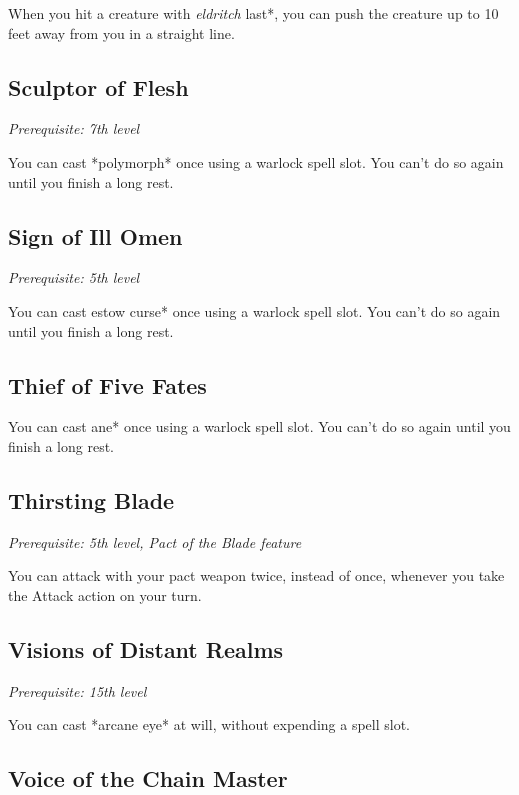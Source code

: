 When you hit a creature with \textit{eldritch }last*, you can push the creature up to 10 feet away from you in a straight line.

\subsection{Sculptor of Flesh}

\textit{Prerequisite: 7th level}

You can cast *polymorph* once using a warlock spell slot. You can’t do so again until you finish a long rest.

\subsection{Sign of Ill Omen}

\textit{Prerequisite: 5th level}

You can cast \textit{}estow curse* once using a warlock spell slot. You can’t do so again until you finish a long rest.

\subsection{Thief of Five Fates}

You can cast \textit{}ane* once using a warlock spell slot. You can’t do so again until you finish a long rest.

\subsection{Thirsting Blade}

\textit{Prerequisite: 5th level, Pact of the Blade feature}

You can attack with your pact weapon twice, instead of once, whenever you take the Attack action on your turn.

\subsection{Visions of Distant Realms}

\textit{Prerequisite: 15th level}

You can cast *arcane eye* at will, without expending a spell slot.

\subsection{Voice of the Chain Master}

